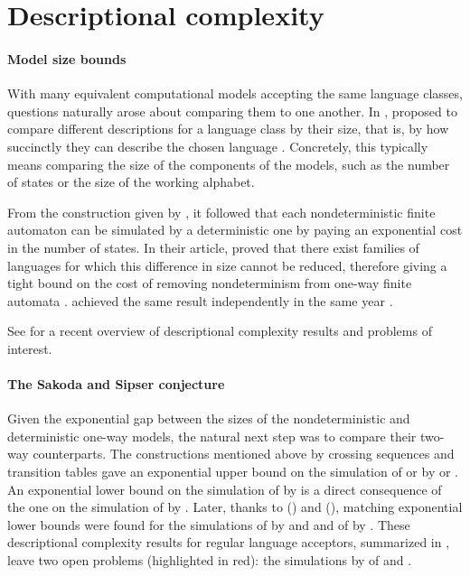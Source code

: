\section{Descriptional complexity}\label{sec:context-descrcomp}

\paragraph{Model size bounds} With many equivalent computational models accepting the same language classes, questions naturally arose about comparing them to one another.
In \citeyear{MeyFis71}, \citeauthor{MeyFis71} proposed to compare different descriptions for a language class by their size, that is, by how succinctly they can describe the chosen language \cite{MeyFis71}.
Concretely, this typically means comparing the size of the components of the models, such as the number of states or the size of the working alphabet.

From the construction given by \citeauthor{RabSco59}, it followed that each nondeterministic finite automaton can be simulated by a deterministic one by paying an exponential cost in the number of states.
In their article, \citeauthor{MeyFis71} proved that there exist families of languages for which this difference in size cannot be reduced, therefore giving a tight bound on the cost of removing nondeterminism from one-way finite automata \cite{MeyFis71}.
\citeauthor{Moo71} achieved the same result independently in the same year \cite{Moo71}.

See \cite{KutMor+21} for a recent overview of descriptional complexity results and problems of interest.

\paragraph{The Sakoda and Sipser conjecture} Given the exponential gap between the sizes of the nondeterministic and deterministic one-way models, the natural next step was to compare their two-way counterparts.
The constructions mentioned above by crossing sequences \cite{RabSco59} and transition tables \cite{She59} gave an exponential upper bound on the simulation of \TNFA or \TDFA by \ONFA or \ODFA.
An exponential lower bound on the simulation of \TNFA by \ODFA is a direct consequence of the one on the simulation of \ONFA by \ODFA.
Later, thanks to \citeauthor{Bir93} (\citeyear{Bir93}) and \citeauthor{Kap05} (\citeyear{Kap05}), matching exponential lower bounds were found for the simulations of \TDFA by \ONFA and \ODFA and of \TNFA by \ONFA \cite{Bir93,Kap05}.
These descriptional complexity results for regular language acceptors, summarized in , leave two open problems (highlighted in red): the simulations by \TDFA of \TNFA and \ONFA.

